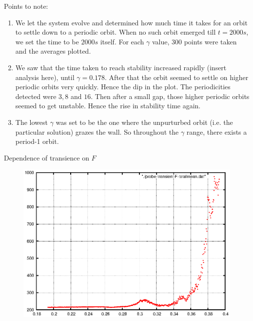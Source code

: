 \documentclass[xcolor=x11names,compress]{beamer}
\renewcommand{\(}{\begin{columns}}
\renewcommand{\)}{\end{columns}}
\newcommand{\<}[1]{\begin{column}{#1}}
\renewcommand{\>}{\end{column}}
\begin{document}
\begin{frame}{Points to note:}
\begin{enumerate}
\item We let the system evolve and determined how much time it takes for an 
orbit to settle down to a periodic orbit.  When no such orbit emerged till $t=2000s$, we set 
the time to be $2000s$ itself.  For each $\gamma$ value, $300$ 
points were taken and the averages plotted.  
\item We saw that the time taken to reach stability increased rapidly (insert 
analysis here), until $\gamma=0.178$.  After that the orbit seemed to settle 
on higher periodic orbits very quickly.  Hence the dip in the plot.  The 
periodicities detected were $3,8$ and $16$.  Then after a small gap, those 
higher periodic orbits seemed to get unstable.  Hence the rise in stability 
time again.  
\item The lowest $\gamma$ was set to be the one where the unpurturbed orbit 
(i.e. the particular solution) grazes the wall.  So throughout the $\gamma$ 
range, there exists a period-1 orbit.  
\end{enumerate}


\end{frame}


\begin{frame}{Dependence of transience on $F$}
\begin{figure}
\begin{center}
\includegraphics[width=0.9\columnwidth]{probeF}
\end{center}
\end{figure}
\end{frame}
\end{document}
